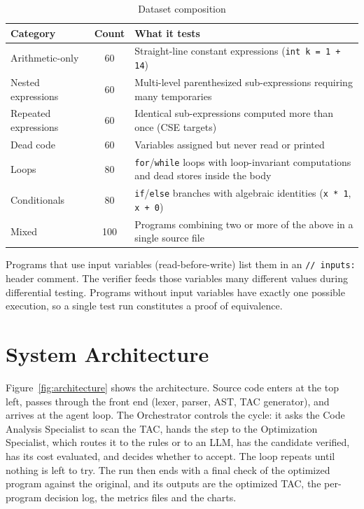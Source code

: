 \documentclass[12pt,a4paper]{report}
\begin{document}
\begin{table}[H]
\centering
\caption{Dataset composition}
\label{tab:dataset}
\begin{tabularx}{\textwidth}{|l|c|X|}
\hline
\textbf{Category} & \textbf{Count} & \textbf{What it tests} \\
\hline
Arithmetic-only & 60 & Straight-line constant expressions (\texttt{int k = 1 + 14}) \\
\hline
Nested expressions & 60 & Multi-level parenthesized sub-expressions requiring many temporaries \\
\hline
Repeated expressions & 60 & Identical sub-expressions computed more than once (CSE targets) \\
\hline
Dead code & 60 & Variables assigned but never read or printed \\
\hline
Loops & 80 & \texttt{for}/\texttt{while} loops with loop-invariant computations and dead stores inside the body \\
\hline
Conditionals & 80 & \texttt{if}/\texttt{else} branches with algebraic identities (\texttt{x * 1}, \texttt{x + 0}) \\
\hline
Mixed & 100 & Programs combining two or more of the above in a single source file \\
\hline
\end{tabularx}
\end{table}

Programs that use input variables (read-before-write) list them in an \texttt{// inputs:} header comment. The verifier feeds those variables many different values during differential testing. Programs without input variables have exactly one possible execution, so a single test run constitutes a proof of equivalence.

\section{System Architecture}

Figure~\ref{fig:architecture} shows the architecture. Source code enters at the top left, passes through the front end (lexer, parser, AST, TAC generator), and arrives at the agent loop. The Orchestrator controls the cycle: it asks the Code Analysis Specialist to scan the TAC, hands the step to the Optimization Specialist, which routes it to the rules or to an LLM, has the candidate verified, has its cost evaluated, and decides whether to accept. The loop repeats until nothing is left to try. The run then ends with a final check of the optimized program against the original, and its outputs are the optimized TAC, the per-program decision log, the metrics files and the charts.
\end{document}
